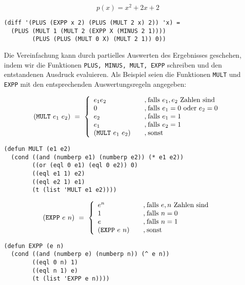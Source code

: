 \[p(x) = x^2 + 2x + 2\]


\begin{verbatim}
(diff '(PLUS (EXPP x 2) (PLUS (MULT 2 x) 2)) 'x) =
  (PLUS (MULT 1 (MULT 2 (EXPP X (MINUS 2 1)))) 
        (PLUS (PLUS (MULT 0 X) (MULT 2 1)) 0))
\end{verbatim}

Die Vereinfachung kann durch partielles Auswerten des Ergebnisses
geschehen, indem wir die Funktionen {\tt PLUS, MINUS, MULT,
EXPP} schreiben und den entstandenen Ausdruck evaluieren.
Als Beispiel seien die Funktionen {\tt MULT} und {\tt EXPP} mit den
entsprechenden Auswertungsregeln angegeben:

\[(\mbox{{\tt MULT}}\ e_1\ e_2)\ =\ \left\{%
   \begin{array}{l@{\quad\quad,\:}l}
     e_1 e_2 & \mbox{falls}\ e_1, e_2\ \mbox{Zahlen sind}\\
     0 & \mbox{falls}\ e_1 = 0\ \mbox{oder}\ e_2 = 0\\
     e_2 & \mbox{falls}\ e_1 = 1\\
     e_1 & \mbox{falls}\ e_2 = 1\\
     (\mbox{{\tt MULT}}\ e_1\ e_2) & \mbox{sonst}
   \end{array} \right.\]

\begin{verbatim}
(defun MULT (e1 e2)
  (cond ((and (numberp e1) (numberp e2)) (* e1 e2))
        ((or (eql 0 e1) (eql 0 e2)) 0)
        ((eql e1 1) e2)
        ((eql e2 1) e1)
        (t (list 'MULT e1 e2))))
\end{verbatim}

\[(\mbox{{\tt EXPP}}\ e\ n)\ =\ \left\{%
   \begin{array}{l@{\quad\quad,\:}l}
     e^{n} & \mbox{falls}\ e, n\ \mbox{Zahlen sind}\\
     1 & \mbox{falls}\ n = 0\\
     e & \mbox{falls}\ n = 1\\
     (\mbox{{\tt EXPP}}\ e\ n) & \mbox{sonst}
   \end{array} \right.\]

\begin{verbatim}
(defun EXPP (e n)
  (cond ((and (numberp e) (numberp n)) (^ e n))
        ((eql 0 n) 1)
        ((eql n 1) e)
        (t (list 'EXPP e n))))
\end{verbatim}

